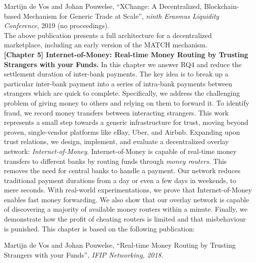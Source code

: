 Martijn de Vos and Johan Pouwelse, \enquote{XChange: A Decentralized, Blockchain-based Mechanism for Generic Trade at Scale}, \emph{ninth Erasmus Liquidity Conference}, 2019 (no proceedings).\\

The above publication presents a full architecture for a decentralized marketplace, including an early version of the MATCH mechanism.\\

\textbf{[Chapter 5] Internet-of-Money: Real-time Money Routing by Trusting Strangers with your Funds.}
In this chapter we answer RQ4 and reduce the settlement duration of inter-bank payments.
The key idea is to break up a particular inter-bank payment into a series of intra-bank payments between strangers which are quick to complete.
Specifically, we address the challenging problem of giving money to others and relying on them to forward it.
To identify fraud, we record money transfers between interacting strangers.
This work represents a small step towards a generic infrastructure for trust, moving beyond proven, single-vendor platforms like eBay, Uber, and Airbnb.
Expanding upon trust relations, we design, implement, and evaluate a decentralized overlay network: \emph{Internet-of-Money}.
Internet-of-Money is capable of real-time money transfers to different banks by routing funds through \emph{money routers}.
This removes the need for central banks to handle a payment.
Our network reduces traditional payment durations from a day or even a few days in weekends, to mere seconds.
With real-world experimentations, we prove that Internet-of-Money enables fast money forwarding.
We also show that our overlay network is capable of discovering a majority of available money routers within a minute.
Finally, we demonstrate how the profit of cheating routers is limited and that misbehaviour is punished.
This chapter is based on the following publication:

Martijn de Vos and Johan Pouwelse, \enquote{Real-time Money Routing by Trusting Strangers with your Funds}, \emph{IFIP Networking, 2018}.\\

